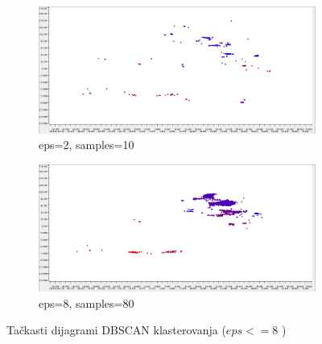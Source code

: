 \documentclass[a4paper]{article}
\begin{document}
\begin{figure}
\centering
\begin{subfigure}[h!]{\textwidth}
	\includegraphics[width=\textwidth]{02_010.png}
	\caption{eps=2, samples=10}
\end{subfigure} 
\begin{subfigure}[h!]{\textwidth}
	\includegraphics[width=\textwidth]{08_080.png}
	\caption{eps=8, samples=80}
\end{subfigure}
\caption{Tačkasti dijagrami DBSCAN klasterovanja ($eps <= 8$ )}
\label{fig:epsmanje}
\end{figure} 
\end{document}
